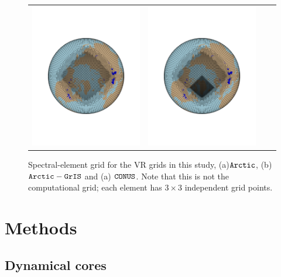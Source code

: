 \documentclass[draft]{agujournal2019}
\begin{document}
\begin{figure}[t]
\begin{center}
\begin{tabular}{cccc}
         \includegraphics[width=60mm]{figs/grid-ARCTIC.pdf}&
         \includegraphics[width=60mm]{figs/grid-ARCTICGRIS.pdf} \\
\end{tabular}
\end{center}
\caption{Spectral-element grid for the VR grids in this study, (a)$\tt Arctic$, (b) $\tt Arctic-GrIS$ and (a) $\tt CONUS$. Note that this is not the computational grid; each element has $3\times3$ independent grid points. {\color{red}{add CONUS grid}}}
\label{fig:vr-grids}
\end{figure}

\section{Methods}\label{sec:methods}
\subsection{Dynamical cores}
\end{document}
